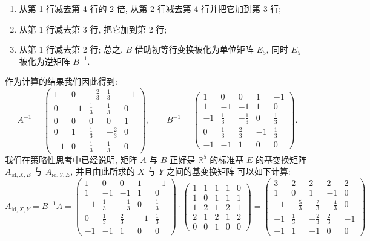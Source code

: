 \begin{enumerate}
\item[(6)] 从第 1 行减去第 4 行的 2 倍, 从第 2 行减去第 4 行并把它加到第 3 行;
\item[(7)] 从第 1 行减去第 3 行, 把它加到第 2 行;
\item[(8)] 从第 1 行减去第 2 行; 总之, $B$ 借助初等行变换被化为单位矩阵 $E_5$, 同时 $E_5$
被化为逆矩阵 $B^{-1}$.
\end{enumerate}

作为计算的结果我们因此得到:
\[
A^{-1} = \begin{pmatrix} 1 & 0 & -\frac{2}{3} & \frac{1}{3} & -1 \\ 0 & -1 & \frac{1}{3} & \frac{1}{3} & 0 \\ 0 & 0 & 0 & 0 & 1 \\ 0 & 1 & \frac{1}{3} & -\frac{2}{3} & 0 \\ -1 & 0 & \frac{1}{3} & \frac{1}{3} & 0 \end{pmatrix},
\qquad
B^{-1} = \begin{pmatrix} 1 & 0 & 0 & 1 & -1 \\ 1 & -1 & -1 & 1 & 0 \\ -1 & \frac{1}{3} & -\frac{1}{3} & 0 & \frac{1}{3} \\ 0 & \frac{1}{3} & \frac{2}{3} & -1 & \frac{1}{3} \\ -1 & -1 & 1 & 0 & 0 \end{pmatrix}\text{.}
\]
我们在策略性思考中已经说明, 矩阵 $A$ 与 $B$ 正好是 $\mathbb{R}^5$ 的标准基 $E$ 的基变换矩阵
$A_{\mathrm{id}, X, E}$ 与 $A_{\mathrm{id}, Y, E}$, 并且由此所求的 $X$ 与 $Y$ 之间的基变换矩阵
可以如下计算:
\[
A_{\mathrm{id}, X, Y} = B^{-1}A = \begin{pmatrix} 1 & 0 & 0 & 1 & -1 \\ 1 & -1 & -1 & 1 & 0 \\ -1 & \frac{1}{3} & -\frac{1}{3} & 0 & \frac{1}{3} \\ 0 & \frac{1}{3} & \frac{2}{3} & -1 & \frac{1}{3} \\ -1 & -1 & 1 & 0 & 0 \end{pmatrix} \cdot \begin{pmatrix} 1 & 1 & 1 & 1 & 0 \\ 1 & 0 & 1 & 1 & 1 \\ 1 & 2 & 1 & 2 & 1 \\ 2 & 1 & 2 & 1 & 2 \\ 0 & 0 & 1 & 0 & 0 \end{pmatrix} = \begin{pmatrix} 3 & 2 & 2 & 2 & 2 \\ 1 & 0 & 1 & -1 & 0 \\ -1 & -\frac{5}{3} & -\frac{2}{3} & -\frac{4}{3} & 0 \\ -1 & \frac{1}{3} & -\frac{2}{3} & \frac{2}{3} & -1 \\ -1 & 1 & -1 & 0 & 0 \end{pmatrix}
\]
